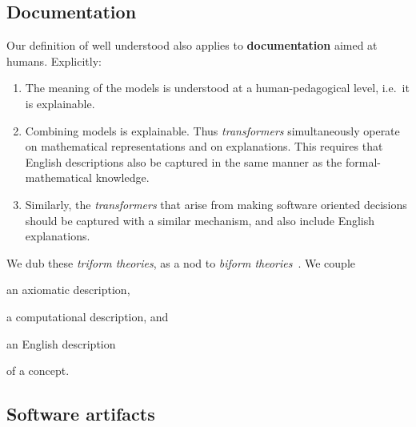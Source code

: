 \documentclass[sigconf,review,anonymous=false]{acmart}
\begin{document}
\subsection{Documentation}
Our definition of well understood also applies to \textbf{documentation} aimed
at humans.  Explicitly:
\begin{enumerate}
\item The meaning of the models is understood at a human-pedagogical
level, i.e.\ it is explainable.
\item Combining models is explainable. Thus \emph{transformers}
simultaneously operate on mathematical representations
and on explanations. This requires that English descriptions also be
captured in the same manner as the formal-mathematical knowledge.
\item Similarly, the \emph{transformers} that arise from making software
oriented decisions should be captured with a similar mechanism, and also include
English explanations.
\end{enumerate}

We dub these \emph{triform theories}, as a nod to \emph{biform
theories}~\cite{Farmer2007}. We couple 
\begin{enumerate*}
\item an axiomatic description,
\item a computational description, and
\item an English description
\end{enumerate*}
of a concept.

%

\subsection{Software artifacts}
\end{document}
